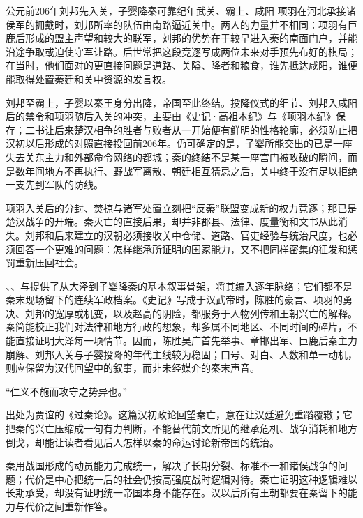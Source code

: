 \begin{event}{公元前206年}{刘邦先入关，子婴降秦}{可靠纪年}{武关、霸上、咸阳}
项羽在河北承接诸侯军的拥戴时，刘邦所率的队伍由南路逼近关中。两人的力量并不相同：项羽有巨鹿后形成的盟主声望和较大的联军，刘邦的优势在于较早进入秦的南面门户，并能沿途争取或迫使守军让路。后世常把这段竞逐写成两位未来对手预先布好的棋局；在当时，他们面对的更直接问题是道路、关隘、降者和粮食，谁先抵达咸阳，谁便能取得处置秦廷和关中资源的发言权。

刘邦至霸上，子婴以秦王身分出降，帝国至此终结。投降仪式的细节、刘邦入咸阳后的禁令和项羽随后入关的冲突，主要由《史记·高祖本纪》与《项羽本纪》保存；二书让后来楚汉相争的胜者与败者从一开始便有鲜明的性格轮廓，必须防止把汉初以后形成的对照直接投回前206年。仍可确定的是，子婴所能交出的已是一座失去关东主力和外部命令网络的都城；秦的终结不是某一座宫门被攻破的瞬间，而是数年间地方不再执行、野战军离散、朝廷相互猜忌之后，关中终于没有足以拒绝一支先到军队的防线。

项羽入关后的分封、焚掠与诸军处置立刻把“反秦”联盟变成新的权力竞逐；那已是楚汉战争的开端。秦灭亡的直接后果，却并非郡县、法律、度量衡和文书从此消失。刘邦和后来建立的汉朝必须接收关中仓储、道路、官吏经验与统治尺度，也必须回答一个更难的问题：怎样继承所证明的国家能力，又不把同样密集的征发和惩罚重新压回社会。
\end{event}

\begin{sourcenote}[谁把秦亡写成了这个样子]
、、与提供了从大泽到子婴降秦的基本叙事骨架，将其编入逐年脉络；它们都不是秦末现场留下的连续军政档案。《史记》写成于汉武帝时，陈胜的豪言、项羽的勇决、刘邦的宽厚或机变，以及赵高的阴险，都服务于人物列传和王朝兴亡的解释。秦简能校正我们对法律和地方行政的想象，却多属不同地区、不同时间的碎片，不能直接证明大泽每一项情节。因而，陈胜吴广首先举事、章邯出军、巨鹿后秦主力崩解、刘邦入关与子婴投降的年代主线较为稳固；口号、对白、人数和单一动机，则应保留为汉代回望中的叙事，而非未经媒介的秦末声音。
\end{sourcenote}

\begin{textwindow}[贾谊《过秦论》]
“仁义不施而攻守之势异也。”

出处为贾谊的《过秦论》。这篇汉初政论回望秦亡，意在让汉廷避免重蹈覆辙；它把秦的兴亡压缩成一句有力判断，不能替代前文所见的继承危机、战争消耗和地方倒戈，却能让读者看见后人怎样以秦的命运讨论新帝国的统治。
\end{textwindow}

\begin{turningpoint}
秦用战国形成的动员能力完成统一，解决了长期分裂、标准不一和诸侯战争的问题；代价是中心把统一后的社会仍按高强度战时逻辑对待。秦亡证明这种逻辑难以长期承受，却没有证明统一帝国本身不能存在。汉以后所有王朝都要在秦留下的能力与代价之间重新作答。
\end{turningpoint}
